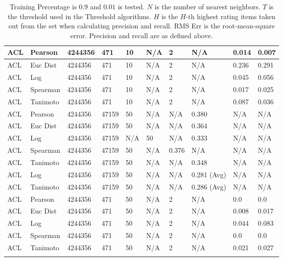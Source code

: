 \documentclass{article}
\begin{document}
\begin{longtable}{ |p{1.7cm}|p{1.9cm}|p{1.5cm}|p{1.5cm}|p{0.75cm}|p{0.75cm}|p{0.75cm}|p{0.75cm}|p{1.5cm}|p{1.5cm}|}
    ACL  & Pearson & 4244356 & 471 & 10 & N/A  & 2 & N/A & 0.014 & 0.007  \\ \hline
    ACL  & Euc Dist & 4244356 & 471 & 10 & N/A  & 2 & N/A &0.236 & 0.291   \\ \hline
    ACL  & Log & 4244356 & 471 & 10 & N/A & 2 & N/A & 0.045 & 0.056  \\ \hline
    ACL  & Spearman & 4244356 & 471 & 10 & N/A  & 2 & N/A &0.017 & 0.025 \\ \hline
    ACL  & Tanimoto & 4244356 & 471 & 10 & N/A  & 2 & N/A & 0.087 & 0.036 \\ \hline
    
    ACL & Pearson & 4244356 & 47159 & 50 & N/A & N/A & 0.380 & N/A & N/A  \\ \hline
    ACL & Euc Dist & 4244356 & 47159 & 50 & N/A & N/A & 0.364 & N/A & N/A   \\ \hline
    ACL & Log & 4244356 & 47159 & N/A &  50 & N/A& 0.333 & N/A & N/A  \\ \hline
    ACL & Spearman & 4244356 & 47159 & 50 & N/A & 0.376 & N/A & N/A & N/A \\ \hline
    ACL & Tanimoto & 4244356 & 47159 & 50 & N/A& N/A & 0.348 & N/A & N/A \\ \hline
    ACL & Log & 4244356 & 47159 & 50 & N/A& N/A & 0.281 (Avg) & N/A & N/A \\ \hline
    ACL & Tanimoto & 4244356 & 47159 & 50 & N/A & N/A & 0.286 (Avg) & N/A & N/A \\ \hline
    
    ACL  & Pearson & 4244356 & 471 & 50 & N/A  & 2 & N/A & 0.0 & 0.0  \\ \hline
    ACL  & Euc Dist & 4244356 & 471 & 50 & N/A  & 2 & N/A &0.008 & 0.017   \\ \hline
    ACL  & Log & 4244356 & 471 & 50 & N/A & 2 & N/A & 0.044 & 0.083  \\ \hline
    ACL  & Spearman & 4244356 & 471 & 50 & N/A  & 2 & N/A &0.0 & 0.0 \\ \hline
    ACL  & Tanimoto & 4244356 & 471 & 50 & N/A  & 2 & N/A & 0.021 & 0.027 \\ \hline

    \hline
    \caption{Training Percentage is $0.9$ and $0.01$ is tested. $N$ is the number of nearest neighbors. $T$ is the threshold
    used in the Threshold algorithms. $H$ is the $H$-th highest rating items taken out from the set when calculating 
    precision and recall. RMS Err is the root-mean-square error. Precision and recall are as defined above.}\label{results-basic}
\end{longtable}
\end{document}
